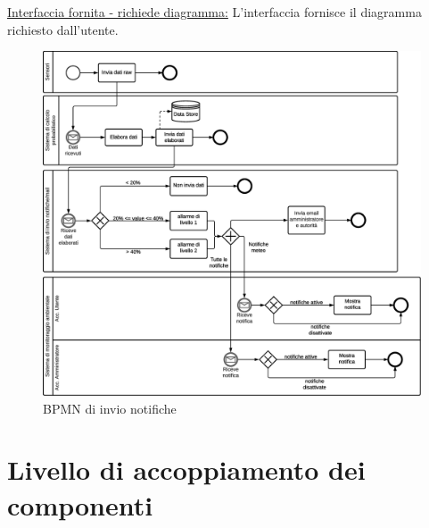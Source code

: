 \vspace{5mm}
\noindent
\underline{Interfaccia fornita - richiede diagramma:} L'interfaccia fornisce il diagramma richiesto dall'utente.


\begin{figure}[ht]
    \centering
    \includegraphics[scale=0.3]{Img/BPMN_Notifiche.eps}
    \caption{BPMN di invio notifiche}
    \label{fig:bpmn_notifiche}
\end{figure}

\pagebreak
\section{Livello di accoppiamento dei componenti}

